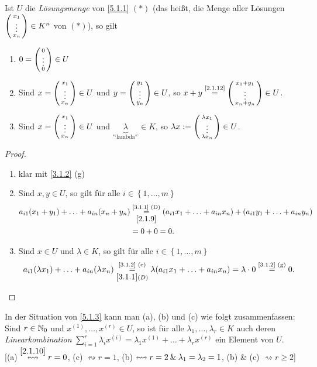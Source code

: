 \documentclass[../../main.tex]{subfiles}
\begin{document}
\begin{pro}\label{5.1.3}
Ist $U$ die \emph{Lösungsmenge} von {\rm\ref{5.1.1} $(*)$} (das heißt, die Menge aller Lösungen $\left(\begin{smallmatrix}x_1\\\vdots\\x_n\end{smallmatrix}\right)\in K^n$ von $(*)$), so gilt
\begin{enumerate}[\rm(a)]
\item $0=\left(\begin{smallmatrix}0\\\vdots\\0\end{smallmatrix}\right)\in U$
\item Sind $x=\left(\begin{smallmatrix}x_1\\\vdots\\x_n\end{smallmatrix}\right)\in U$ und $y=\left(\begin{smallmatrix}y_1\\\vdots\\y_n\end{smallmatrix}\right)\in U$, so $x+y\overset{\text{\rm\ref{2.1.12}}}=\left(\begin{smallmatrix}x_1+y_1\\\vdots\\x_n+y_n\end{smallmatrix}\right)\in U$.
\item Sind $x=\left(\begin{smallmatrix}x_1\\\vdots\\x_n\end{smallmatrix}\right)\in U$ und $\underbrace{\lambda}_\text{"`lambda"'}\in K$, so $\lambda x:=\left(\begin{smallmatrix}\lambda x_1\\\vdots\\\lambda x_n\end{smallmatrix}\right)\in U$.
\end{enumerate}
\end{pro}
\begin{proof}
\begin{enumerate}[\normalfont(a)]
\item klar mit \ref{3.1.2} (g)
\item Sind $x,y\in U$, so gilt für alle $i\in \left\{1,\ldots,m\right\}$
\begin{align*}
a_{i1}(x_1+y_1)+\ldots+a_{in}(x_n+y_n)&\overset{\text{\ref{3.1.1} (D)}}{\underset{\ref{2.1.9}}=} (a_{i1}x_1+\ldots+a_{in}x_n)+(a_{i1}y_1+\ldots+a_{in}y_n)\\
&=0+0=0.\end{align*}
\item Sind $x\in U$ und $\lambda\in K$, so gilt für alle $i\in \left\{1,\ldots,m\right\}$
$$a_{i1}(\lambda x_1)+\ldots+a_{in}(\lambda x_n)\overset{\text{\ref{3.1.2} (e)}}{\underset{\ref{3.1.1} (D)}=} \lambda(a_{i1}x_1+\ldots+a_{in}x_n)=\lambda\cdot0\overset{\text{\ref{3.1.2} (g)}}=0.$$
\end{enumerate}
\end{proof}

\begin{bem}\label{5.1.4}
In der Situation von \ref{5.1.3} kann man (a), (b) und (c) wie folgt zusammenfassen:
Sind $r\in\mathbb N_0$ und $x^{(1)},\ldots,x^{(r)}\in U$, so ist für alle $\lambda_1,\ldots,\lambda_r\in K$ auch deren \emph{Linearkombination} $\sum_{i=1}^r \lambda_ix^{(i)}=\lambda_1x^{(1)}+\ldots+\lambda_rx^{(r)}$ ein Element von $U$.\\
{[(a) $\overset{\ref{2.1.10}}\leftrightsquigarrow r=0$, (c) $\leftrightsquigarrow r=1$, (b) $\leftrightsquigarrow r=2\mathbin{\&} \lambda_1=\lambda_2=1$, (b) \& (c) $\rightsquigarrow r\geq 2$]}
\end{bem}
\end{document}
